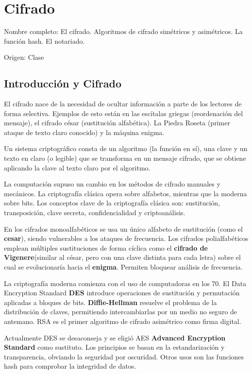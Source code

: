 \setcounter{section}{77} %
\section{Cifrado}

Nombre completo: El cifrado. Algoritmos de cifrado simétricos y asimétricos. La función hash. El notariado.

Origen: Clase

\localtableofcontents

\subsection{Introducción y Cifrado} %
    El cifrado nace de la necesidad de ocultar información a parte de los lectores de forma selectiva. Ejemplos de esto están en las escítalas griegas (reordenación del mensaje), el cifrado césar (sustitución alfabética). La Piedra Roseta (primer ataque de texto claro conocido) y la máquina enigma.

    Un sistema criptográfico consta de un algoritmo (la función en sí), una clave y un texto en claro (o legible) que se transforma en un mensaje cifrado, que se obtiene aplicando la clave al texto claro por el algoritmo.

    La computación supuso un cambio en los métodos de cifrado manuales y mecánicos. La criptografía clásica opera sobre alfabetos, mientras que la moderna sobre bits. Los conceptos clave de la criptografía clásica son: sustitución, transposición, clave secreta, confidencialidad y criptoanálisis. 

    En los cifrados monoalfabéticos se usa un único alfabeto de sustitución (como el \textbf{cesar}), siendo vulnerables a los ataques de frecuencia. Los cifrados polialfabéticos emplean múltiples sustituciones de forma cíclica como el \textbf{cifrado de Vigenere}(similar al césar, pero con una clave distinta para cada letra) sobre el cual se evolucionaría hacia el \textbf{enigma}. Permiten bloquear análisis de frecuencia.

    La criptografía moderna comienza con el uso de computadoras en los 70. El Data Encryption Standard \textbf{DES} introduce operaciones de sustitución y permutación aplicadas a bloques de bits. \textbf{Diffie-Hellman} resuelve el problema de la distribución de claves, permitiendo intercambiarlas por un medio no seguro de antemano. RSA es el primer algoritmo de cifrado asimétrico como firma digital.

    Actualmente DES se desaconseja y se eligió AES \textbf{Advanced Encryption Standard} como sustituto. Los principios se basan en la estandarización y transparencia, obviando la seguridad por oscuridad. Otros usos son las funciones hash para comprobar la integridad de datos.

